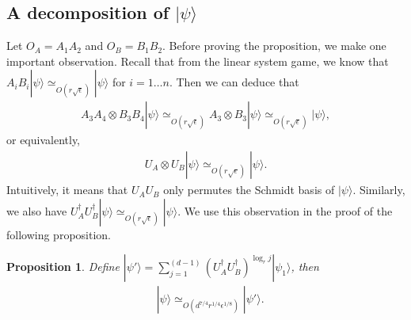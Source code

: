 \documentclass[11pt,letterpaper]{article}
\newcommand{\ket}[1]{|#1\rangle}
\newcommand{\x}{\otimes}
\newcommand{\ct}{^{\dagger}}
\newcommand{\1}{\mathbb{1}}
\newcommand{\ep}{\epsilon}
\newcommand{\se}{\sqrt{\epsilon}}
\newcommand{\appd}[1]{\simeq_{#1}}
\newtheorem{proposition}[theorem]{Proposition}
\theoremstyle{definition}
\begin{document}
\subsection{A decomposition of $\ket{\psi}$}
Let $O_A = A_1A_2$ and $O_B = B_1B_2$.
Before proving the proposition, we make one important observation.
Recall that from the linear system game, we know that $A_iB_i \ket{\psi} \appd{O(r\se)} \ket{\psi}$ for $i = 1 \dots n$.
Then we can deduce that 
\begin{align}
	A_3A_4 \x B_3B_4 \ket{\psi} \appd{O(r\se)} A_3 \x B_3 \ket{\psi} \appd{O(r\se)} \ket{\psi},
\end{align}
or equivalently,
\begin{align}
	U_A \x U_B \ket{\psi} \appd{O(r\se)} \ket{\psi}.
\end{align}
Intuitively, it means that $U_A U_B $ only permutes the Schmidt basis of $\ket{\psi}$.
Similarly, we also have $U_A\ct U_B\ct \ket{\psi} \appd{O(r\se)} \ket{\psi}$.
We use this observation in the proof of the following proposition.
\begin{proposition}
\label{prop:decomp_psi}
Define 
$\ket{\psi'} = \sum_{j=1}^{(d-1)} (U_A\ct U_B\ct)^{\log_r j} \ket{\psi_1}$,
then
\begin{align}
	&\ket{\psi} \appd{O(d^{7/4} r^{1/4} \ep^{1/8})} \ket{\psi'}.
\end{align}
\end{proposition}
\end{document}
